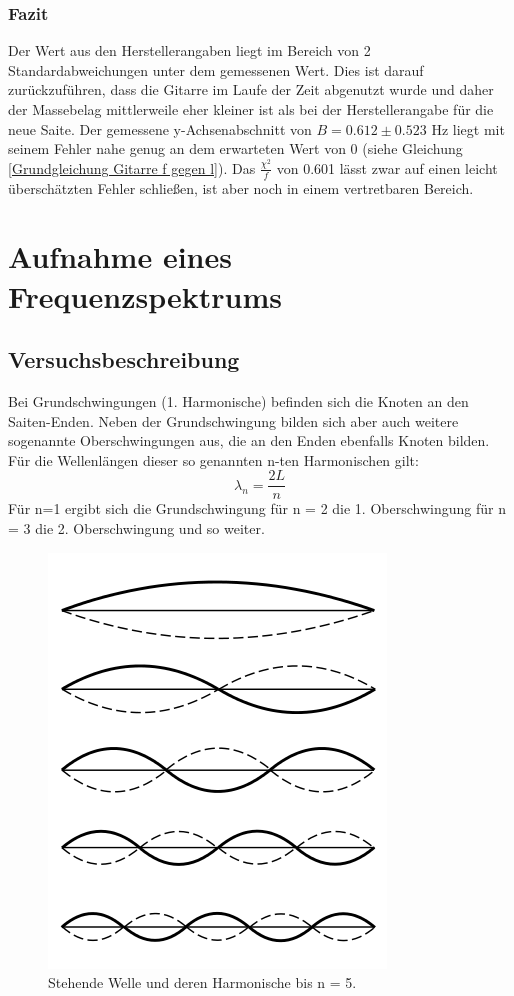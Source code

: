 \documentclass[12pt,a4paper]{article}
\begin{document}
\subsubsection{Fazit}
Der Wert aus den Herstellerangaben liegt im Bereich von 2 Standardabweichungen unter dem gemessenen Wert. Dies ist darauf zurückzuführen, dass die Gitarre im Laufe der Zeit abgenutzt wurde und daher der Massebelag mittlerweile eher kleiner ist als bei der Herstellerangabe für die neue Saite. \newline
Der gemessene y-Achsenabschnitt von $B = 0.612 \pm 0.523$ Hz liegt mit seinem Fehler nahe genug an dem erwarteten Wert von 0 (siehe Gleichung \ref{Grundgleichung Gitarre f gegen l}).
\newline
Das $\frac{\chi^2}{f}$ von 0.601 lässt zwar auf einen leicht überschätzten Fehler schließen, ist aber noch in einem vertretbaren Bereich.
\section{Aufnahme eines Frequenzspektrums}
\subsection{Versuchsbeschreibung}
Bei Grundschwingungen (1. Harmonische) befinden sich die Knoten an den Saiten-Enden. Neben der Grundschwingung bilden sich aber auch weitere sogenannte Oberschwingungen aus, die an den Enden ebenfalls Knoten bilden. Für die Wellenlängen dieser so genannten  n-ten Harmonischen gilt:
\begin{equation}
\lambda_n=	\frac{2L}{n}
\end{equation}
Für n=1 ergibt sich die Grundschwingung für n = 2 die 1. Oberschwingung für n = 3 die 2. Oberschwingung und so weiter.
\newline
\begin{figure}[H]
\centering
\includegraphics[scale=1]{Bilder/Harmonische.png}
\caption{Stehende Welle und deren Harmonische bis n = 5.}
\end{figure}
\end{document}
